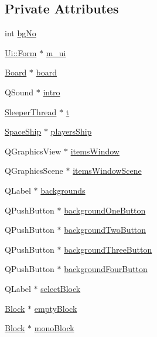 \subsection*{Private Attributes}
\begin{DoxyCompactItemize}
\item 
int \hyperlink{class_form_aec3ab393c4a0660c7b5fc7b7ece67d9a}{bgNo}
\item 
\hyperlink{class_ui_1_1_form}{Ui::Form} $\ast$ \hyperlink{class_form_a719f9ac1c34536d610446a2a8f65656c}{m\_\-ui}
\item 
\hyperlink{class_board}{Board} $\ast$ \hyperlink{class_form_a465e7b53a888759044031a0de6ede98d}{board}
\item 
QSound $\ast$ \hyperlink{class_form_a9a0efcb36e9c6f17a1a8a9b8976dccba}{intro}
\item 
\hyperlink{class_sleeper_thread}{SleeperThread} $\ast$ \hyperlink{class_form_ac44e1693a46054cf0ba47b7c03d397f6}{t}
\item 
\hyperlink{class_space_ship}{SpaceShip} $\ast$ \hyperlink{class_form_ad209e021a3dbed6ae132c32a642aaf2f}{playersShip}
\item 
QGraphicsView $\ast$ \hyperlink{class_form_a51d3d962a2815f75b507506e7ab94e4a}{itemsWindow}
\item 
QGraphicsScene $\ast$ \hyperlink{class_form_ad05b2988fa73fab67b1794dae8ebe1b6}{itemsWindowScene}
\item 
QLabel $\ast$ \hyperlink{class_form_ab0d3fbc5a7fa42afd081f2dd21dae053}{backgrounds}
\item 
QPushButton $\ast$ \hyperlink{class_form_ae5c82e727fbfccafdcc407c86dc93d7a}{backgroundOneButton}
\item 
QPushButton $\ast$ \hyperlink{class_form_adbf445820483e664f777256868fd705e}{backgroundTwoButton}
\item 
QPushButton $\ast$ \hyperlink{class_form_a8f813fd062201f9f61458446ede57100}{backgroundThreeButton}
\item 
QPushButton $\ast$ \hyperlink{class_form_a8457205717f75aacbf589e2bae555f5e}{backgroundFourButton}
\item 
QLabel $\ast$ \hyperlink{class_form_a473ac73bbd99b470d340f9c613bfb5a7}{selectBlock}
\item 
\hyperlink{class_block}{Block} $\ast$ \hyperlink{class_form_a4bd31a76f382c885ce3d1cb6a19568eb}{emptyBlock}
\item 
\hyperlink{class_block}{Block} $\ast$ \hyperlink{class_form_a2eaddff9897b282b0f693d62fa5fb353}{monoBlock}
\item 

\end{DoxyCompactItemize}
